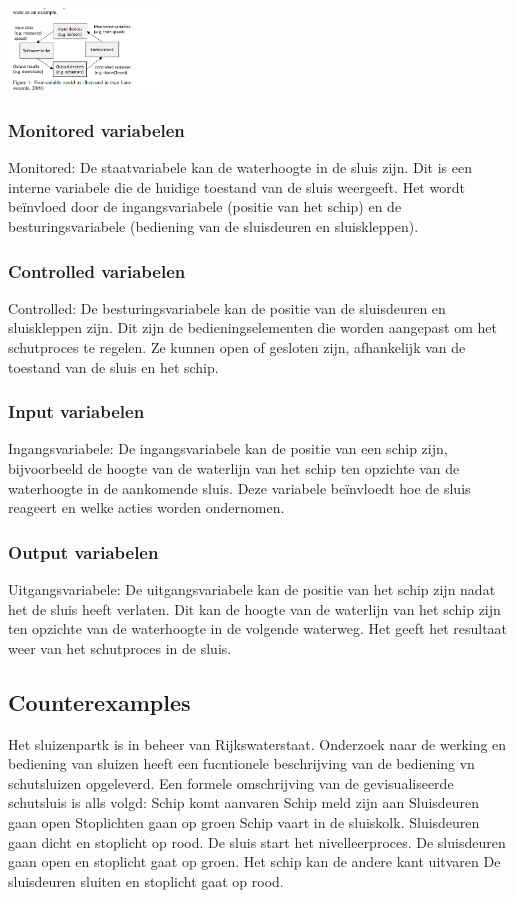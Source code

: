 \documentclass{article}
\begin{document}
	\includegraphics[width=4cm]{4varmodel.png} %
	\subsubsection{Monitored variabelen}
	Monitored: De staatvariabele kan de waterhoogte in de sluis zijn. Dit is een interne variabele die de huidige toestand van de sluis weergeeft. Het wordt beïnvloed door de ingangsvariabele (positie van het schip) en de besturingsvariabele (bediening van de sluisdeuren en sluiskleppen).
	\subsubsection{Controlled variabelen}
		Controlled: De besturingsvariabele kan de positie van de sluisdeuren en sluiskleppen zijn. Dit zijn de bedieningselementen die worden aangepast om het schutproces te regelen. Ze kunnen open of gesloten zijn, afhankelijk van de toestand van de sluis en het schip.
	\subsubsection{Input variabelen}
	Ingangsvariabele: De ingangsvariabele kan de positie van een schip zijn, bijvoorbeeld de hoogte van de waterlijn van het schip ten opzichte van de waterhoogte in de aankomende sluis. Deze variabele beïnvloedt hoe de sluis reageert en welke acties worden ondernomen.
	\subsubsection{Output variabelen}
	Uitgangsvariabele: De uitgangsvariabele kan de positie van het schip zijn nadat het de sluis heeft verlaten. Dit kan de hoogte van de waterlijn van het schip zijn ten opzichte van de waterhoogte in de volgende waterweg. Het geeft het resultaat weer van het schutproces in de sluis.

	
	
	
	
	\subsection{Counterexamples}
	Het sluizenpartk is in beheer van Rijkswaterstaat. Onderzoek naar de werking en bediening van  sluizen
	heeft een fucntionele beschrijving van de bediening vn schutsluizen opgeleverd. Een formele omschrijving van de gevisualiseerde schutsluis is alls volgd:
	Schip komt aanvaren
	Schip meld zijn aan
	Sluisdeuren gaan open
	Stoplichten gaan op groen
	Schip vaart in de sluiskolk.
	Sluisdeuren gaan dicht en stoplicht op rood.
	De sluis start het nivelleerproces.
	De sluisdeuren  gaan open en stoplicht gaat op groen.
	Het schip kan de andere kant uitvaren
	De sluisdeuren sluiten en stoplicht gaat op rood.
\end{document}
